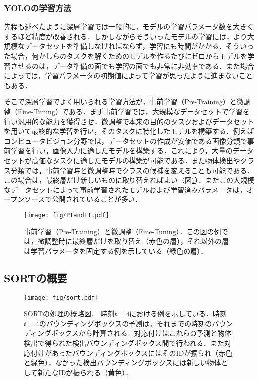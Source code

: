         \subsubsection{YOLOの学習方法}

        先程も述べたように深層学習では一般的に，モデルの学習パラメータ数を大きくするほど精度が改善される．しかしながらそういったモデルの学習には，より大規模なデータセットを準備しなければならず，学習にも時間がかかる．そういった場合，何かしらのタスクを解くためのモデルを作るたびにゼロからモデルを学習させるのは，データ準備の面でも学習の面でも非常に非効率である．また場合によっては，学習パラメータの初期値によって学習が思ったように進まないこともある．

        そこで深層学習でよく用いられる学習方法が，事前学習（Pre-Training）と微調整（Fine-Tuning）である\cite{radford2018improving}．まず事前学習では，大規模なデータセットで学習を行い汎用的な能力を獲得させ，微調整で本来の目的のタスクおよびデータセットを用いて最終的な学習を行い，そのタスクに特化したモデルを構築する．例えばコンピュータビジョン分野では，データセットの作成が安価である画像分類で事前学習を行い，画像入力に適したモデルを構築する．これにより，大量のデータセットが高価なタスクに適したモデルの構築が可能である．また物体検出やクラス分類では，事前学習時と微調整時でクラスの候補を変えることも可能である．この場合は，最終層だけ新しいものに取り替えればよい（図\ref{fig:PTandFT}）．またこの大規模なデータセットによって事前学習されたモデルおよび学習済みパラメータは，オープンソースで公開されていることが多い．

        \begin{figure}[t]
            \centering    
            \texttt{[image: fig/PTandFT.pdf]}
            \caption[事前学習（Pre-Training）と微調整（Fine-Tuning）]{事前学習（Pre-Training）と微調整（Fine-Tuning）．この図の例では，微調整時に最終層だけを取り替え（赤色の層），それ以外の層は学習パラメータを固定する例を示している（緑色の層）．}
            \label{fig:PTandFT}
        \end{figure}

    \subsection{SORTの概要}
    \label{subsec:abstract_of_sort}

    \begin{figure}[t]
        \centering
        \texttt{[image: fig/sort.pdf]}
        \caption[SORTの処理の概略図]{SORTの処理の概略図．
        時刻$t=4$における例を示している．時刻$t=4$のバウンディングボックスの予測は，それまでの時刻のバウンディングボックスから計算される．対応付けはこれらの予測と物体検出で得られた検出バウンディングボックス間で行われる．また対応付けがあったバウンディングボックスにはそのIDが振られ（赤色と緑色），なかった検出バウンディングボックスには新しい物体として新たなIDが振られる（黄色）．}
        \label{fig:sort}
    \end{figure}

